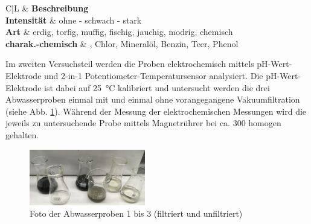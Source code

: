 \vspace*{-2.5mm}
\renewcommand{\arraystretch}{1.2}
\begin{table}[h!]
	\centering
	\caption{Wahrgenommene Einstufungen der Färbung und Trübung der Abwasserproben 1 bis 3}
	\label{tab:einstufung_geruch}
	\begin{tabulary}{\textwidth}{C|L}
		\hline
		\textbf{} & \textbf{Beschreibung} \\
		\hline
		\textbf{Intensität}	& ohne - schwach - stark\\
		\textbf{Art}		& erdig, torfig, muffig, fischig, jauchig, modrig, chemisch\\
		\textbf{charak.-chemisch  }	& , Chlor, Mineralöl, Benzin, Teer, Phenol\\
		\hline
	\end{tabulary}
\end{table}
\FloatBarrier
\vspace*{-2.5mm}


\newpage

Im zweiten Versuchsteil werden die Proben elektrochemisch mittels pH-Wert-Elektrode und 2-in-1 Potentiometer-Temperatursensor analysiert. Die pH-Wert-Elektrode ist dabei auf \SI{25}{\celsius} kalibriert und untersucht werden die drei Abwasserproben einmal mit und einmal ohne vorangegangene Vakuumfiltration (siehe Abb. \ref{fig:proben_filter}). \linebreak Während der Messung der elektrochemischen Messungen wird die jeweils zu untersuchende Probe mittels Magnetrührer bei ca. \SI{300}{\rpm} homogen gehalten.

\begin{figure}[h!]
	\centering
	\includegraphics[width=0.45\textwidth]{img/proben_filter}
	\caption{Foto der Abwasserproben 1 bis 3 (filtriert und unfiltriert)}
	\label{fig:proben_filter}
\end{figure}
\FloatBarrier

